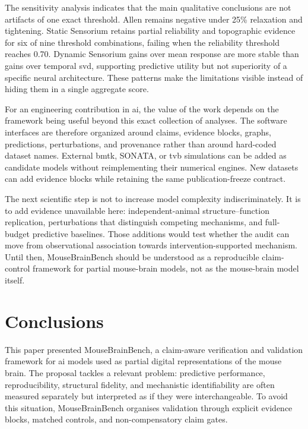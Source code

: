 \documentclass[a4paper,fleqn]{cas-sc}
\begin{document}
The sensitivity analysis indicates that the main qualitative conclusions are
not artifacts of one exact threshold. Allen remains negative under 25\%
relaxation and tightening. Static Sensorium retains partial reliability and
topographic evidence for six of nine threshold combinations, failing when the
reliability threshold reaches 0.70. Dynamic Sensorium gains over mean response
are more stable than gains over temporal \acs{svd}, supporting predictive utility but
not superiority of a specific neural architecture. These patterns make the
limitations visible instead of hiding them in a single aggregate score.

For an engineering contribution in \acs{ai}, the value of the
work depends on the framework being useful beyond this exact collection of
analyses. The software interfaces are therefore organized around claims,
evidence blocks, graphs, predictions, perturbations, and provenance rather than
around hard-coded dataset names. External \acs{bmtk}, SONATA, or \acs{tvb}
simulations can be added as candidate models without reimplementing their
numerical engines. New datasets can add evidence blocks while retaining the
same publication-freeze contract.

The next scientific step is not to increase model complexity indiscriminately.
It is to add evidence unavailable here: independent-animal structure--function
replication, perturbations that distinguish competing mechanisms, and
full-budget predictive baselines. Those additions would test whether the audit
can move from observational association towards intervention-supported
mechanism. Until then, MouseBrainBench should be understood as a reproducible
claim-control framework for partial mouse-brain models, not as the mouse-brain
model itself.

\section{Conclusions}
\label{sec:conclusions}

This paper presented MouseBrainBench, a claim-aware verification and validation
framework for \acs{ai} models used as partial digital representations of the
mouse brain. The proposal tackles a relevant problem: predictive performance,
reproducibility, structural fidelity, and mechanistic identifiability are often
measured separately but interpreted as if they were interchangeable. To avoid
this situation, MouseBrainBench organises validation through explicit evidence
blocks, matched controls, and non-compensatory claim gates.
\end{document}
